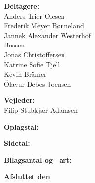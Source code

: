 \begin{titlepage}
\begin{minipage}{0.4\textwidth}
\begin{description}
    \item {\bf Deltagere:}\\
    Anders Trier Olesen\\
    Frederik Meyer Bønneland\\
    Jannek Alexander Westerhof \\Bossen\\
    Jonas Christoffersen\\
    Katrine Sofie Tjell\\
    Kevin Brämer\\
    Ólavur Debes Joensen\\
    
    \item {\bf Vejleder:}\\
    Filip Stubkjær Adamsen\\
    
    \item {\bf Oplagstal:} \rprints
    \item {\bf Sidetal:} \pageref{LastPage} %
    \item {\bf Bilagsantal og --art:} \rappendices
    \item {\bf Afsluttet den} \rdeadline
    \end{description}
  \end{minipage}
  \hfill
  \newline\newline\newline
\end{titlepage}

